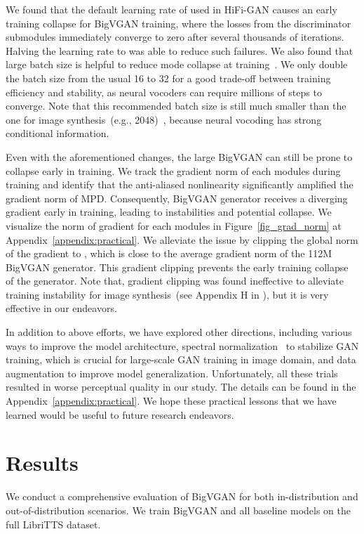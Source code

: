 \documentclass{article} \usepackage{iclr2023_conference,times}
\theoremstyle{plain}
\theoremstyle{definition}
\theoremstyle{remark}
\begin{document}
We found that the default learning rate of  used in HiFi-GAN causes an early training collapse for BigVGAN training, where the losses from the discriminator submodules immediately converge to zero after several thousands of iterations. Halving the learning rate to  was able to reduce such failures. 
We also found that large batch size is helpful to reduce mode collapse at training~\citep{brock2018large}. We only double the batch size from the usual 16 to 32 for a good trade-off between training efficiency and stability, as neural vocoders can require millions of steps to converge. Note that this recommended batch size is still much smaller than the one for image synthesis~(e.g., 2048)~\citep{brock2018large}, because neural vocoding has strong conditional information.

Even with the aforementioned changes, the large BigVGAN can still be prone to collapse early in training. We track the gradient norm of each modules during training and identify that the anti-aliased nonlinearity significantly amplified the gradient norm of MPD. Consequently, BigVGAN generator receives a diverging gradient early in training, leading to instabilities and potential collapse. We visualize the norm of gradient for each modules in Figure~\ref{fig_grad_norm} at Appendix~\ref{appendix:practical}. We alleviate the issue by clipping the global norm of the gradient to , which is close to the average gradient norm of the 112M BigVGAN generator. This gradient clipping prevents the early training collapse of the generator. Note that, gradient clipping was found ineffective to alleviate training instability for image synthesis~(see Appendix H in \citet{brock2018large}), but it is very effective in our endeavors.


In addition to above efforts, we have explored other directions, including various ways to improve the model architecture,  spectral normalization~\citep{miyato2018spectral} to stabilize GAN training, which is crucial for large-scale GAN training in image domain, and data augmentation to improve model generalization. Unfortunately, all these trials resulted in worse perceptual quality in our study. The details can be found in the Appendix~\ref{appendix:practical}. We hope these practical lessons that we have learned would be useful to future research endeavors.



\vspace{-.2cm}
\section{Results}
\label{sec:results}
\vspace{-.2cm}
We conduct a comprehensive evaluation of BigVGAN for both in-distribution and out-of-distribution scenarios.
We train BigVGAN and all baseline models on the full LibriTTS dataset.
\end{document}
